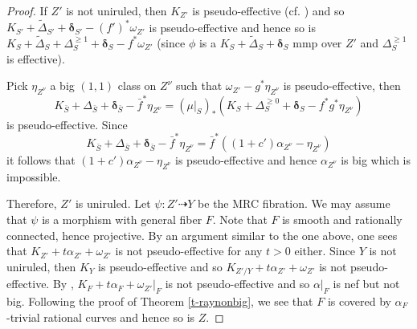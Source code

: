 \documentclass[11pt]{amsart}
\numberwithin{equation}{section}
\def\ddelta{\boldsymbol{\delta}}
\theoremstyle{definition}
\theoremstyle{definition}
\theoremstyle{definition}
\begin{document}
\begin{proof}
If $Z'$ is not uniruled, then $K_{Z'}$ is pseudo-effective (cf. \cite{Ou25}) and so  $K_{S'}+\tilde \Delta _{S'}+ \ddelta _{S'}-(f')^*\omega _{Z'}$ is pseudo-effective and hence so is $K_{S}+\tilde \Delta _{S}+\Delta _S^{\geq 1}+ \ddelta _{S}-f^*\omega _{Z'}$ (since $\phi$ is a $K_{S}+\tilde \Delta _{S}+ \ddelta _{S}$ mmp over $Z'$ and $\Delta _S^{\geq 1}$ is effective).

Pick $\eta _{Z^\nu}$ a big $(1,1) $ class on $Z^\nu$ such that $\omega _{Z'}-g^*\eta _{Z^\nu}$ is pseudo-effective, then \[K_{\bar S}+\Delta _{\bar S} +\ddelta _{\bar S}-\bar f ^*\eta _{Z^\nu}=(\mu |_S)_*( K_{S}+\Delta _{S}^{\geq 0}+ \ddelta _{ S}-f^*g^*\eta _{Z^\nu})\]
is pseudo-effective. Since \[K_{\bar S}+\Delta _{\bar S} +\ddelta _{\bar S}-\bar f ^*\eta _{Z^\nu}=\bar{f}^*((1+c')\alpha_{Z^\nu}- \eta _{Z^\nu})\] it follows that $(1+c')\alpha _{Z^\nu}- \eta _{Z^\nu}$ is pseudo-effective and hence $\alpha _{Z^\nu}$ is big which is impossible.

Therefore, $Z'$ is uniruled.
Let $\psi:Z'\dasharrow Y$ be the MRC fibration. We may assume that $\psi$ is a morphism with general fiber $F$. Note that $F$ is smooth and rationally connected, hence projective. By an argument similar to the one above, one sees that $K_{Z'}+t\alpha_{Z'}+\omega _{Z'}$ is not pseudo-effective for any $t>0$ either. Since $Y$ is not uniruled, then $K_Y$ is pseudo-effective and so $K_{Z'/Y}+t\alpha_{Z'}+\omega _{Z'}$ is not pseudo-effective. By \cite[Theorem 5.2]{CH20}, $K_F+t\alpha _F+\omega _{Z'}|_F$ is not pseudo-effective and so $\alpha |_F$ is nef but not big. 
Following the proof of Theorem \ref{t-raynonbig}, we see that $F$ is covered by $\alpha _F$-trivial rational curves and hence so is $Z$.

\end{proof}
\end{document}
